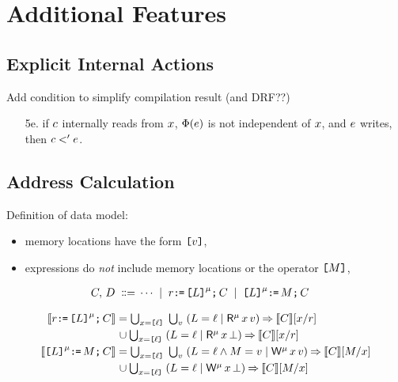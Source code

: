 \section{Additional Features}

\subsection{Explicit Internal Actions}

Add condition to simplify compilation result (and DRF??)
\begin{itemize}
\item[5e.] if $c$ internally reads from $x$, $\Phi(e)$ is
  not independent of $x$, and $e$ writes, then $c<'e$.
\end{itemize}


\subsection{Address Calculation}

Definition of data model:
\begin{itemize}
\item memory locations have the form $\texttt{[}v\texttt{]}$,
\item expressions do \emph{not} include memory locations or the operator $\texttt{[}M\texttt{]}$,
\end{itemize}

\begin{align*}
C,\,D
\;\mathrel{\mathord{\vcentcolon}\mkern-1mu\mathord{\vcentcolon}\mathord{{=}}}\;& \cdots
\;\mathrel{|}\; r\texttt{:}\mkern-1mu\texttt{=}\,\texttt{[}L\texttt{]}^{\mu}\texttt{;}\,\allowbreak C 
\;\mathrel{|}\; \texttt{[}L\texttt{]}^{\mu}\texttt{:}\mkern-1mu\texttt{=}\,M\texttt{;}\,\allowbreak C
\end{align*}

\begin{align*}
  \sem{\aReg\GETS\REF{\cExp}^\amode\SEMI \aCmd} & =
  \textstyle\bigcup_{\aLoc=\REF{\cVal}}\; \textstyle\bigcup_\aVal\; ({\cExp}=\cVal \mid \DRmode\aLoc\aVal) \prefix \sem{\aCmd}[\aLoc/\aReg] 
  \\ & \mkern2mu\cup \textstyle\bigcup_{\aLoc=\REF{\cVal}}\; ({\cExp}=\cVal \mid\iDRmode{\aLoc}{\aVal}) \prefix \sem{\aCmd}[\aLoc/\aReg]
  \\
  \sem{\REF{\cExp}^\amode\GETS\aExp\SEMI \aCmd} & =
  \textstyle\bigcup_{\aLoc=\REF{\cVal}}\; \textstyle\bigcup_\aVal\; ({\cExp}=\cVal \land \aExp=\aVal \mid \DWmode\aLoc\aVal) \prefix \sem{\aCmd}[\aExp/\aLoc]
  \\ & \mkern2mu\cup \textstyle\bigcup_{\aLoc=\REF{\cVal}}\; ({\cExp}=\cVal \mid \iDWmode{\aLoc}{\aVal}) \prefix \sem{\aCmd}[\aExp/\aLoc]  
\end{align*}


